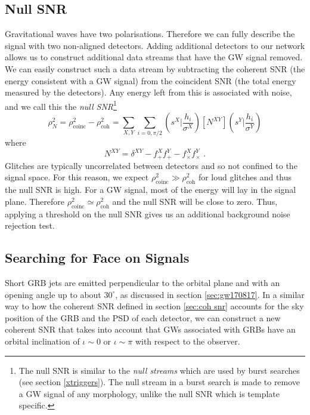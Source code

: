 \documentclass[11pt]{cuthesis}
\newcommand{\fs}{\text{ .}}
\begin{document}
\subsection{Null SNR} \label{sec:null snr}
Gravitational waves have two polarisations. Therefore we can fully describe the signal with two non-aligned detectors. Adding additional detectors to our network allows us to construct additional data streams that have the GW signal removed. We can easily construct such a data stream by subtracting the coherent SNR (the energy consistent with a GW signal) from the coincident SNR (the total energy measured by the detectors). Any energy left from this is associated with noise, and we call this the \textit{null SNR}\footnote{The null SNR is similar to the \textit{null streams} which are used by burst searches (see section \ref{xtriggers}). The null stream in a burst search is made to remove a GW signal of any morphology, unlike the null SNR which is template specific.}
\begin{equation} \label{null snr}
\rho_N^2 = \rho_\text{coinc}^2 - \rho_\text{coh}^2 = \sum_{X,Y} \sum_{i=0,\pi/2} \left( s^X \bigg| \frac{h_i}{\sigma^X} \right) [N^{XY}]  \left( s^Y \bigg| \frac{h_i}{\sigma^Y} \right)
\end{equation} 
where
\begin{equation}
N^{XY} = \delta^{XY} - f^X_{+}f^Y_{+} - f^X_{\times}f^Y_{\times} \fs
\end{equation}
Glitches are typically uncorrelated between detectors and so not confined to the signal space. For this reason, we expect $\rho_\text{coinc}^2 \gg \rho_\text{coh}^2$ for loud glitches and thus the null SNR is high. For a GW signal, most of the energy will lay in the signal plane. Therefore $\rho_\text{coinc}^2 \simeq \rho_\text{coh}^2$ and the null SNR will be close to zero. Thus, applying a threshold on the null SNR gives us an additional background noise rejection test.

\subsection{Searching for Face on Signals} \label{sec:circ pol}
Short GRB jets are emitted perpendicular to the orbital plane and with an opening angle up to about $30^\circ$, as discussed in section \ref{sec:gw170817}. In a similar way to how the coherent SNR defined in section \ref{sec:coh snr} accounts for the sky position of the GRB and the PSD of each detector, we can construct a new coherent SNR that takes into account that GWs associated with GRBs have an orbital inclination of $\iota \sim 0$ or $\iota \sim \pi$ with respect to the observer.
\end{document}
